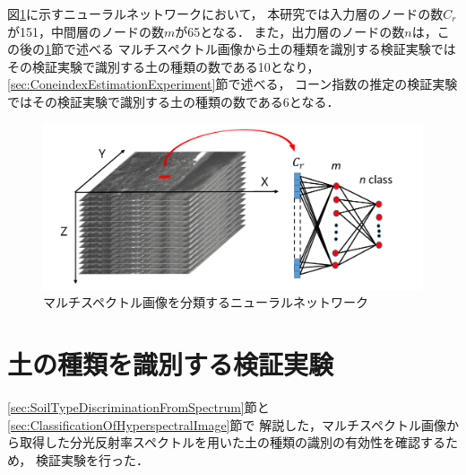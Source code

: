 図\ref{fig:neuralnetwork}に示すニューラルネットワークにおいて，
本研究では入力層のノードの数$C_r$が151，中間層のノードの数$m$が65となる．
また，出力層のノードの数$n$は，この後の\ref{sec:PreliminaryExperimentOfDiscrimination}節で述べる
マルチスペクトル画像から土の種類を識別する検証実験ではその検証実験で識別する土の種類の数である10となり，
\ref{sec:ConeindexEstimationExperiment}節で述べる，
コーン指数の推定の検証実験ではその検証実験で識別する土の種類の数である6となる．

\begin{figure}[b]
	\begin{center}
	\centering
	\includegraphics[width=13cm]{./Ch3_SoilTypeDiscrimination/Fig/neuralnetwork_for_hyperspectralimage_compressed.pdf}
	\caption{マルチスペクトル画像を分類するニューラルネットワーク}\label{fig:neuralnetwork}
	\vspace{6cm}
	\end{center}
\end{figure}

\clearpage

\section{土の種類を識別する検証実験}
\label{sec:PreliminaryExperimentOfDiscrimination}

\ref{sec:SoilTypeDiscriminationFromSpectrum}節と\ref{sec:ClassificationOfHyperspectralImage}節で
解説した，マルチスペクトル画像から取得した分光反射率スペクトルを用いた土の種類の識別の有効性を確認するため，
検証実験を行った．

